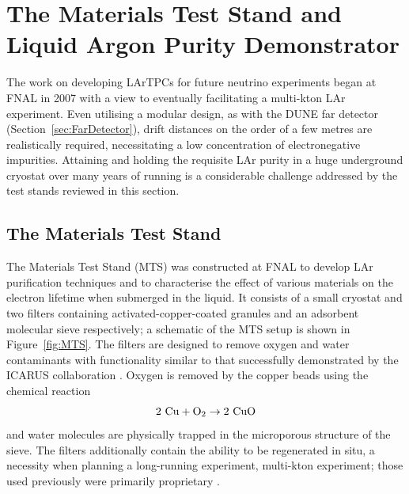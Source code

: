 \section[The Materials Test Stand and Liquid Argon Purity Demonstrator]{The Materials Test Stand and\\Liquid Argon Purity Demonstrator}\label{sec:MTSLAPD}

The work on developing LArTPCs for future neutrino experiments began at FNAL in 2007 with a view to eventually facilitating a multi-kton LAr experiment.  Even utilising a modular design, as with the DUNE far detector (Section~\ref{sec:FarDetector}), drift distances on the order of a few metres are realistically required, necessitating a low concentration of electronegative impurities.  Attaining and holding the requisite LAr purity in a huge underground cryostat over many years of running is a considerable challenge addressed by the test stands reviewed in this section.

\subsection{The Materials Test Stand}\label{sec:MTS}

The Materials Test Stand (MTS) \cite{MTS2006,MTS2009a,MTS2009b,MTS2011} was constructed at FNAL to develop LAr purification techniques and to characterise the effect of various materials on the electron lifetime when submerged in the liquid.  It consists of a small cryostat and two filters containing activated-copper-coated granules and an adsorbent molecular sieve respectively; a schematic of the MTS setup is shown in Figure~\ref{fig:MTS}.  The filters are designed to remove oxygen and water contaminants with functionality similar to that successfully demonstrated by the ICARUS collaboration \cite{ICARUS1993b}.  Oxygen is removed by the copper beads using the chemical reaction
\begin{equation}
  2~\textnormal{Cu} + \textnormal{O}_2 \rightarrow 2~\textnormal{CuO}
\end{equation}
and water molecules are physically trapped in the microporous structure of the sieve.  The filters additionally contain the ability to be regenerated in situ, a necessity when planning a long-running experiment, multi-kton experiment; those used previously were primarily proprietary \cite{ICARUS1993a,ICARUS2006}.

